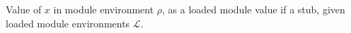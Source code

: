 Value of $x$ in module environment $\rho$, as a loaded module value if a stub, given loaded module environments
$\mathcal{L}$.
